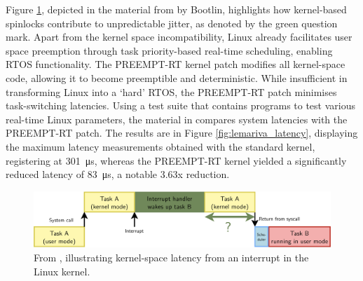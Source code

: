 Figure \ref{fig:bootlin_flow}, depicted in the material from \cite{bootlinUnderstandingLinuxRealtime2024} by Bootlin, highlights how kernel-based spinlocks contribute to unpredictable jitter, as denoted by the green question mark. Apart from the kernel space incompatibility, Linux already facilitates user space preemption through task priority-based real-time scheduling, enabling RTOS functionality. The PREEMPT-RT kernel patch modifies all kernel-space code, allowing it to become preemptible and deterministic. While insufficient in transforming Linux into a `hard' RTOS, the PREEMPT-RT patch minimises task-switching latencies. Using a test suite that contains programs to test various real-time Linux parameters, the material in \cite{maurorivaRaspberryPi4B2019} compares system latencies with the PREEMPT-RT patch. The results are in Figure \ref{fig:lemariva_latency}, displaying the maximum latency measurements obtained with the standard kernel, registering at \SI{301}{\micro\second}, whereas the PREEMPT-RT kernel yielded a significantly reduced latency of \SI{83}{\micro\second}, a notable 3.63x reduction.

\begin{figure}[H]
    \centering
    \includegraphics[width=1\textwidth]{assets/bootlin-interrupt-flow.png}
    \caption{From \cite{bootlinUnderstandingLinuxRealtime2024}, illustrating kernel-space latency from an interrupt in the Linux kernel.}
    \label{fig:bootlin_flow}
\end{figure}

